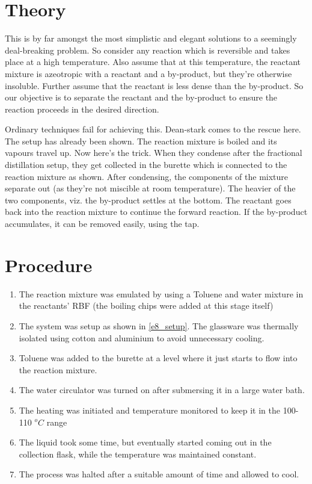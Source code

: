 \section{Theory}
	This is by far amongst the most simplistic and elegant solutions to a seemingly deal-breaking problem. So consider any reaction which is reversible and takes place at a high temperature. Also assume that at this temperature, the reactant mixture is azeotropic with a reactant and a by-product, but they're otherwise insoluble. Further assume that the reactant is less dense than the by-product. So our objective is to separate the reactant and the by-product to ensure the reaction proceeds in the desired direction.
	\par
	Ordinary techniques fail for achieving this. Dean-stark comes to the rescue here. The setup has already been shown. The reaction mixture is boiled and its vapours travel up. Now here's the trick. When they condense after the fractional distillation setup, they get collected in the burette which is connected to the reaction mixture as shown. After condensing, the components of the mixture separate out (as they're not miscible at room temperature). The heavier of the two components, viz. the by-product settles at the bottom. The reactant goes back into the reaction mixture to continue the forward reaction. If the by-product accumulates, it can be removed easily, using the tap.

\section{Procedure}
	\begin{enumerate}
		\item The reaction mixture was emulated by using a Toluene and water mixture in the reactants' RBF (the boiling chips were added at this stage itself)
		\item The system was setup as shown in \autoref{e8_setup}. The glassware was thermally isolated using cotton and aluminium to avoid unnecessary cooling.
		\item Toluene was added to the burette at a level where it just starts to flow into the reaction mixture.
		\item The water circulator was turned on after submersing it in a large water bath.
		\item The heating was initiated and temperature monitored to keep it in the 100-110 $^o C$ range
		\item The liquid took some time, but eventually started coming out in the collection flask, while the temperature was maintained constant.
		\item The process was halted after a suitable amount of time and allowed to cool.
	\end{enumerate}

